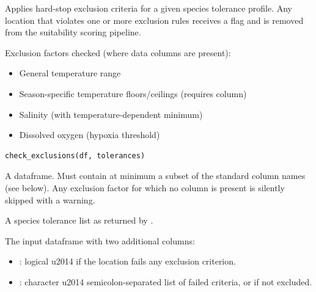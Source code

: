 \documentclass[a4paper]{book}
\begin{document}
%
\begin{Description}
Applies hard-stop exclusion criteria for a given species tolerance profile.
Any location that violates one or more exclusion rules receives a flag and
is removed from the suitability scoring pipeline.

Exclusion factors checked (where data columns are present):
\begin{itemize}

\item{} General temperature range
\item{} Season-specific temperature floors/ceilings (requires  column)
\item{} Salinity (with temperature-dependent minimum)
\item{} Dissolved oxygen (hypoxia threshold)

\end{itemize}

\end{Description}
%
\begin{Usage}
\begin{verbatim}
check_exclusions(df, tolerances)
\end{verbatim}
\end{Usage}
%
\begin{Arguments}
\begin{ldescription}
\item[\code{df}] A dataframe. Must contain at minimum a subset of the standard
column names (see  below). Any exclusion factor for
which no column is present is silently skipped with a warning.

\item[\code{tolerances}] A species tolerance list as returned by
.
\end{ldescription}
\end{Arguments}
%
\begin{Value}
The input dataframe with two additional columns:
\begin{itemize}

\item{} : logical \bsl{}u2014  if the location fails any exclusion criterion.
\item{} : character \bsl{}u2014 semicolon-separated list of failed criteria,
or  if not excluded.

\end{itemize}

\end{Value}
\end{document}
